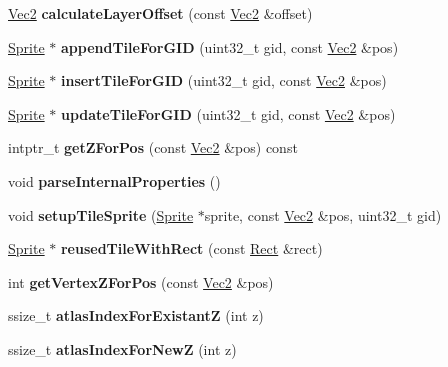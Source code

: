 \begin{DoxyCompactItemize}
\item 
\mbox{\label{classTMXLayer_a429b05f5840cdebf4591a93ae3571068}} 
\hyperlink{classVec2}{Vec2} {\bfseries calculate\+Layer\+Offset} (const \hyperlink{classVec2}{Vec2} \&offset)
\item 
\mbox{\label{classTMXLayer_a4eb8fa0ade1f622de66e6f742b4802e5}} 
\hyperlink{classSprite}{Sprite} $\ast$ {\bfseries append\+Tile\+For\+G\+ID} (uint32\+\_\+t gid, const \hyperlink{classVec2}{Vec2} \&pos)
\item 
\mbox{\label{classTMXLayer_a403cd35937e55e13dbbfab83c8e82f4e}} 
\hyperlink{classSprite}{Sprite} $\ast$ {\bfseries insert\+Tile\+For\+G\+ID} (uint32\+\_\+t gid, const \hyperlink{classVec2}{Vec2} \&pos)
\item 
\mbox{\label{classTMXLayer_accb4bd18aaf4c6b2032046d3938348b6}} 
\hyperlink{classSprite}{Sprite} $\ast$ {\bfseries update\+Tile\+For\+G\+ID} (uint32\+\_\+t gid, const \hyperlink{classVec2}{Vec2} \&pos)
\item 
\mbox{\label{classTMXLayer_ad5b917115b5fed7aca7ce8e18a2b7e82}} 
intptr\+\_\+t {\bfseries get\+Z\+For\+Pos} (const \hyperlink{classVec2}{Vec2} \&pos) const
\item 
\mbox{\label{classTMXLayer_a971029e08d5cb9d854c68134c81f1c98}} 
void {\bfseries parse\+Internal\+Properties} ()
\item 
\mbox{\label{classTMXLayer_a7be28ea19c3ff186facd556602adbcb1}} 
void {\bfseries setup\+Tile\+Sprite} (\hyperlink{classSprite}{Sprite} $\ast$sprite, const \hyperlink{classVec2}{Vec2} \&pos, uint32\+\_\+t gid)
\item 
\mbox{\label{classTMXLayer_acc47bf10ca720e2d984da2f2fef823b3}} 
\hyperlink{classSprite}{Sprite} $\ast$ {\bfseries reused\+Tile\+With\+Rect} (const \hyperlink{classRect}{Rect} \&rect)
\item 
\mbox{\label{classTMXLayer_a43dd1ce85ca7b58d34e6939c9c6d9ca9}} 
int {\bfseries get\+Vertex\+Z\+For\+Pos} (const \hyperlink{classVec2}{Vec2} \&pos)
\item 
\mbox{\label{classTMXLayer_adba8a4560f349073db1a1c185f55add1}} 
ssize\+\_\+t {\bfseries atlas\+Index\+For\+ExistantZ} (int z)
\item 
\mbox{\label{classTMXLayer_a9e6175d0907ed291698fe3f00e0a1618}} 
ssize\+\_\+t {\bfseries atlas\+Index\+For\+NewZ} (int z)
\end{DoxyCompactItemize}
